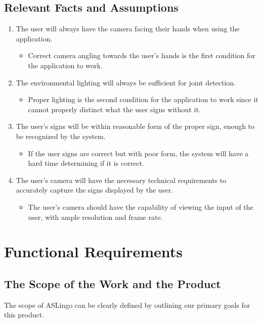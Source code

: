 \documentclass[12pt, titlepage]{article}
\begin{document}
\subsection{Relevant Facts and Assumptions}

\begin{enumerate}
    \item The user will always have the camera facing their hands when using the application.
    \begin{itemize}
        \item[] Correct camera angling towards the user's hands is the first condition for the application to work.
    \end{itemize}
    \item The environmental lighting will always be sufficient for joint detection.
    \begin{itemize}
        \item[] Proper lighting is the second condition for the application to work since it cannot properly distinct what the user signs without it.
    \end{itemize}
    \item The user's signs will be within reasonable form of the proper sign, enough to be recognized by the system.
    \begin{itemize}
        \item[] If the user signs are correct but with poor form, the system will have a hard time determining if it is correct.
    \end{itemize}
    \item The user's camera will have the necessary technical requirements to accurately capture the signs displayed by the user.
    \begin{itemize}
        \item[] The user's camera should have the capability of viewing the input of the user, with ample resolution and frame rate.
    \end{itemize}
\end{enumerate}

\section{Functional Requirements}

\subsection{The Scope of the Work and the Product}
The scope of ASLingo can be clearly defined by outlining our primary goals for this product.
\end{document}
